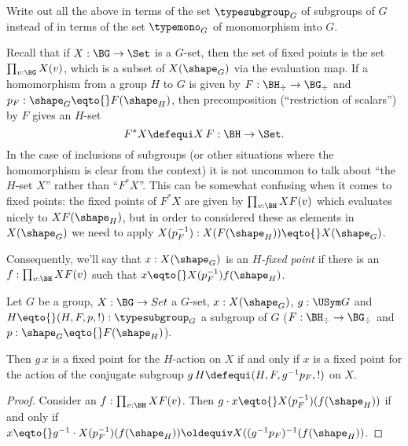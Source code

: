 \begin{xca}
  Write out all the above in terms of the set $\typesubgroup_G$ of subgroups of $G$ instead of in terms of the set $\typemono_G$ of monomorphism into $G$.
\end{xca}


Recall that if $X:\BG\to\Set$ is a $G$-set, then the set of fixed points is the set $\prod_{v:\BG}X(v)$, which is a subset of $X(\shape_G)$ via the evaluation map.  If a homomorphism from a group $H$ to $G$ is given by $F:\BH_\div\to \BG_\div$ and $p_F:\shape_G\eqto{}F(\shape_H)$, then precomposition (``restriction of scalars'') by $F$ gives an $H$-set
$$F^*X\defequi X\,F:\BH\to\Set.$$
In the case of inclusions of subgroups (or other situations where the homomorphism is clear from the context) it is not uncommon to talk about ``the $H$-set $X$'' rather than ``$F^*X$''.
This can be somewhat confusing when it comes to fixed points: the fixed points of $F^*X$ are given by $\prod_{v:\BH}XF(v)$ which evaluates nicely to $XF(\shape_H)$, but in order to considered  these as elements in $X(\shape_G)$ we need to apply $X(p_F^{-1}):X(F(\shape_H))\eqto{}X(\shape_G)$.

Consequently, we'll say that $x:X(\shape_G)$ is an \emph{$H$-fixed point} if there is an $f:\prod_{v:\BH}XF(v)$ such that $x\eqto{}X(p_F^{-1})f(\shape_H)$.



\begin{lemma}
  \label{lem:thereisaconjugate}
  Let $G$ be a group, $X:\BG\to Set$ a $G$-set, $x:X(\shape_G)$, $g:\USym G$ and $H\eqto{}(H,F,p,!):\typesubgroup_G$ a subgroup of $G$ ($F:\BH_\div\to \BG_\div$ and $p:\shape_G\eqto{}F(\shape_H)$).

Then $g\,x$ is a fixed point for the $H$-action on $X$ if and only if $x$ is a fixed point for the action  of the conjugate subgroup $g\,H\defequi(H,F,g^{-1}p_F,!)$ on $X$.
\end{lemma}
\begin{proof}
  Consider an $f:\prod_{v:\BH}XF(v)$.  Then $g\cdot x\eqto{}X(p_F^{-1})(f(\shape_H))$ if and only if $x\eqto{}g^{-1}\cdot X(p_F^{-1})(f(\shape_H))\oldequiv X((g^{-1}p_F)^{-1}(f(\shape_H))$.
\end{proof}





